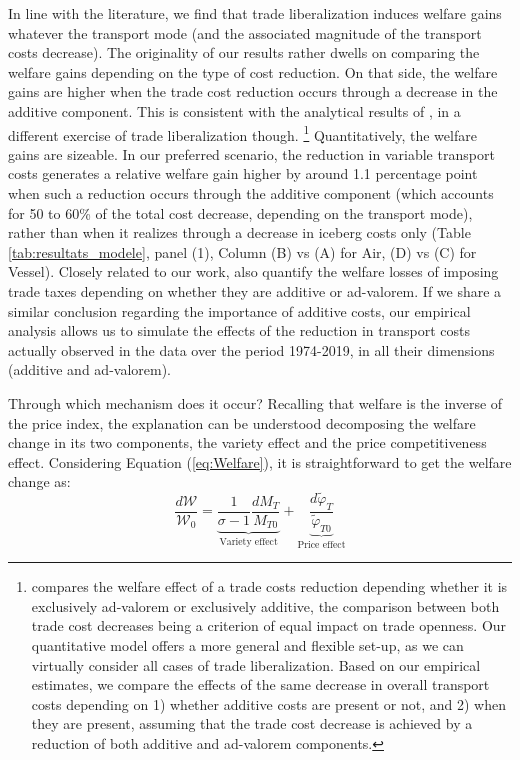 \documentclass[a4paper,11pt]{article}
\begin{document}
In line with the literature, we find that trade liberalization induces welfare gains whatever the transport mode (and the associated magnitude of the transport costs decrease). The originality of our results rather dwells on comparing the welfare gains depending on the type of cost reduction. On that side, the welfare gains are higher when the trade cost reduction occurs through a decrease in the additive component. This is consistent with the analytical results of \cite{sorensen2014}, in a different exercise of trade liberalization though. \footnote{\cite{sorensen2014} compares the welfare effect of a trade costs reduction depending whether it is exclusively ad-valorem or exclusively additive, the comparison between both trade cost decreases being a criterion of equal impact on trade openness. Our quantitative model offers a more general and flexible set-up, as we can virtually consider all cases of trade liberalization. Based on our empirical estimates, we compare the effects of the same decrease in overall transport costs depending on 1) whether additive costs are present or not, and 2) when they are present, assuming that the trade cost decrease is achieved by a reduction of both additive and ad-valorem components.} Quantitatively, the welfare gains are sizeable. In our preferred scenario, the reduction in variable transport costs generates a relative welfare gain higher by around 1.1 percentage point when such a reduction occurs through the additive component (which accounts for 50 to 60\% of the total cost decrease, depending on the transport mode), rather than when it realizes through a decrease in iceberg costs only (Table \ref{tab:resultats_modele}, panel (1), Column (B) vs (A) for Air, (D) vs (C) for Vessel). Closely related to our work, \cite{Irrazabal_2015} also quantify the welfare losses of imposing trade taxes depending on whether they are additive or ad-valorem. If we share a similar conclusion regarding the importance of additive costs, our empirical analysis allows us to simulate the effects of the reduction in transport costs actually observed in the data over the period 1974-2019, in all their dimensions (additive and ad-valorem). \smallskip

Through which mechanism does it occur? Recalling that welfare is the inverse of the price index, the explanation can be understood decomposing the welfare change in its two components, the variety effect and the price competitiveness effect. Considering Equation (\ref{eq:Welfare}), it is straightforward to get the welfare change as:
\begin{equation}
\frac{d\mathcal{W}}{\mathcal{W}_0} = \underbrace{\frac{1}{\sigma-1} \frac{d M_T}{M_{T0}}}_{\text{Variety effect}} +  \underbrace{\frac{d\widetilde{\varphi}_T}{\widetilde{\varphi}_{T0}}}_{\text{Price effect}} \label{eq:decompWelfare}
\end{equation}
\end{document}
